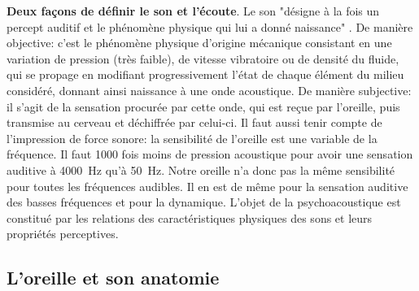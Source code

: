 \textbf{ Deux façons de définir le son et l'écoute}.
Le son "désigne à la fois un percept auditif et le phénomène physique qui lui a donné naissance" \autocite{doronparot}.
De manière objective:
c'est le phénomène phy\-si\-que
d'origine mécanique consistant en une variation de pression (très
faible), de vitesse vibratoire ou de densité du fluide, qui se propage
en modifiant progressivement l'état de chaque élément du milieu considéré,
donnant ainsi naissance à une onde acoustique.
De manière subjective:
	il s'agit de la sensation procurée
	par cette onde, qui est reçue par l'oreille, puis transmise au cerveau
	et déchiffrée par celui-ci. \autocite {futura-sciences}
Il faut aussi tenir compte de l'impression de force sonore: la sensibilité de l'oreille
est une variable de la fréquence. Il faut 1000 fois moins de pression
acoustique pour avoir une sensation auditive à \SI{4000}{\hertz} qu'à \SI{50}{\hertz}.
Notre oreille n'a donc pas la même sensibilité pour toutes
les fréquences audibles. Il en est de même pour la sensation auditive
des basses fréquences et pour la dynamique.
L'objet de la psychoacoustique est constitué par les relations des caractéristiques physiques des sons et 
leurs propriétés perceptives.




\subsection {L'oreille et son anatomie}


